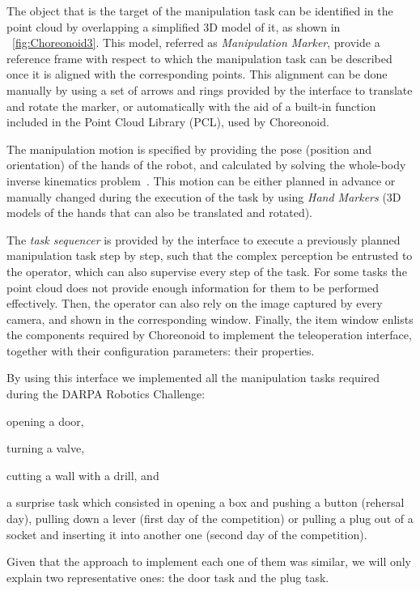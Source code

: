	The object that is the target of the manipulation task can be identified in the point cloud
	by overlapping a simplified 3D model of it, as shown in \figurename~\ref{fig:Choreonoid3}.
	This model, referred as \emph{Manipulation Marker}, provide a reference frame with respect
	to which the manipulation task can be described once it is aligned with the corresponding
	points.
	This alignment can be done manually by using a set of arrows and rings provided by the interface
	to translate and rotate the marker, or automatically with the aid of a built-in function included
	in the Point Cloud Library (PCL), used by Choreonoid.
	
	The manipulation motion is specified by providing the pose (position and orientation)
	of the hands of the robot, and calculated by solving the whole-body inverse kinematics
	problem~\cite{Kanoun}.
	This motion can be either planned in advance or manually changed during the execution of the task
	by using \emph{Hand Markers} (3D models of the hands that can also be translated and rotated).
	
	The \emph{task sequencer} is provided by the interface to execute a previously planned manipulation
	task step by step, such that the complex perception be entrusted to the operator, which	can also
	supervise every step of the task.
	For some tasks the point cloud does not provide enough information for them to be performed effectively.
	Then, the operator can also rely on the image captured by every camera,
	and shown in the corresponding window.
	Finally, the item window enlists the components required by Choreonoid to implement the teleoperation
	interface, together with their configuration parameters: their properties.
	
	By using this interface we implemented all the manipulation tasks required during the
	DARPA Robotics Challenge:
	\begin{inparaenum}[(1)]
		\item opening a door,
		\item turning a valve,
		\item cutting a wall with a drill, and
		\item a surprise task which consisted in opening a box and pushing a button (rehersal day),
					pulling down a lever (first day of the competition) or
					pulling a plug out of a socket and inserting it into another one (second day of the competition).
	\end{inparaenum}
	Given that the approach to implement each one of them was similar,
	we will only explain two representative ones:
	the door task and the plug task.